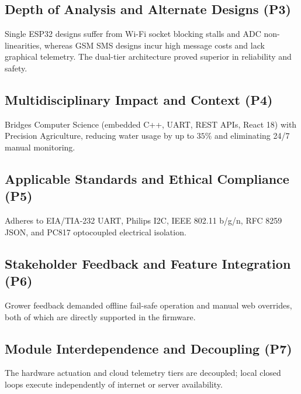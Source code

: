 \documentclass[conference]{IEEEtran}
\begin{document}
\subsection{Depth of Analysis and Alternate Designs (P3)}
Single ESP32 designs suffer from Wi-Fi socket blocking stalls and ADC non-linearities, whereas GSM SMS designs incur high message costs and lack graphical telemetry. The dual-tier architecture proved superior in reliability and safety.

\subsection{Multidisciplinary Impact and Context (P4)}
Bridges Computer Science (embedded C++, UART, REST APIs, React 18) with Precision Agriculture, reducing water usage by up to $35\%$ and eliminating 24/7 manual monitoring.

\subsection{Applicable Standards and Ethical Compliance (P5)}
Adheres to EIA/TIA-232 UART, Philips I2C, IEEE 802.11 b/g/n, RFC 8259 JSON, and PC817 optocoupled electrical isolation.

\subsection{Stakeholder Feedback and Feature Integration (P6)}
Grower feedback demanded offline fail-safe operation and manual web overrides, both of which are directly supported in the firmware.

\subsection{Module Interdependence and Decoupling (P7)}
The hardware actuation and cloud telemetry tiers are decoupled; local closed loops execute independently of internet or server availability.
\end{document}
